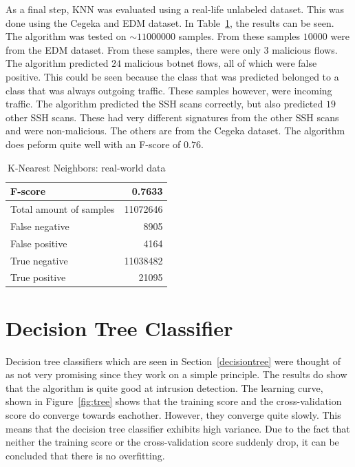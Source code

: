 \noindent As a final step, KNN was evaluated using a real-life unlabeled dataset. This was done using the Cegeka and EDM dataset. In Table~\ref{tab:knn:cegeka}, the results can be seen. The algorithm was tested on $\sim11000000$ samples. From these samples $10000$ were from the EDM dataset. From these samples, there were only $3$ malicious flows. The algorithm predicted $24$ malicious botnet flows, all of which were false positive. This could be seen because the class that was predicted belonged to a class that was always outgoing traffic. These samples however, were incoming traffic. The algorithm predicted the SSH scans correctly, but also predicted $19$ other SSH scans. These had very different signatures from the other SSH scans and were non-malicious. The others are from the Cegeka dataset. The algorithm does peform quite well with an F-score of $0.76$. 

\begin{table}[H]
\caption{K-Nearest Neighbors: real-world data}
\label{tab:knn:cegeka}
\centering
\begin{tabular}{l  r}
\toprule
F-score & 0.7633\\
\midrule
Total amount of samples & 11072646 \\
False negative &  8905 \\
False positive & 4164 \\
True negative &  11038482 \\
True positive & 21095 \\
\bottomrule
\end{tabular}
\end{table}

\newpage
\section{Decision Tree Classifier}

Decision tree classifiers which are seen in Section~\ref{decisiontree} were thought of as not very promising since they work on a simple principle. The results do show that the algorithm is quite good at intrusion detection. The learning curve, shown in Figure~\ref{fig:tree} shows that the training score and the cross-validation score do converge towards eachother. However, they converge quite slowly. This means that the decision tree classifier exhibits high variance. Due to the fact that neither the training score or the cross-validation score suddenly drop, it can be concluded that there is no overfitting. 

